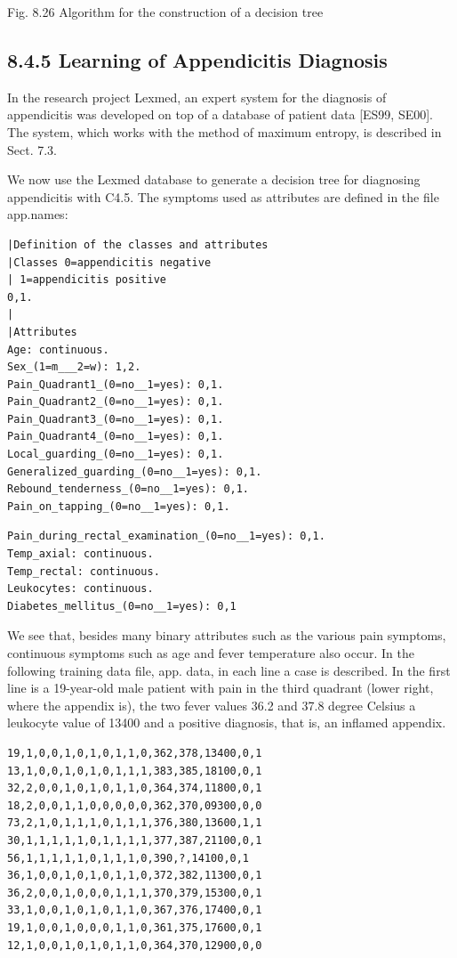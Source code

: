 \documentclass[10pt]{book}
\begin{document}
\begin{center}
\begin{enumerate}
\begin{center}
\begin{center}
Fig. 8.26 Algorithm for the construction of a decision tree

\subsection*{8.4.5 Learning of Appendicitis Diagnosis}
In the research project Lexmed, an expert system for the diagnosis of appendicitis was developed on top of a database of patient data [ES99, SE00]. The system, which works with the method of maximum entropy, is described in Sect. 7.3.

We now use the Lexmed database to generate a decision tree for diagnosing appendicitis with C4.5. The symptoms used as attributes are defined in the file app.names:

\begin{verbatim}
|Definition of the classes and attributes
|Classes 0=appendicitis negative
| 1=appendicitis positive
0,1.
|
|Attributes
Age: continuous.
Sex_(1=m___2=w): 1,2.
Pain_Quadrant1_(0=no__1=yes): 0,1.
Pain_Quadrant2_(0=no__1=yes): 0,1.
Pain_Quadrant3_(0=no__1=yes): 0,1.
Pain_Quadrant4_(0=no__1=yes): 0,1.
Local_guarding_(0=no__1=yes): 0,1.
Generalized_guarding_(0=no__1=yes): 0,1.
Rebound_tenderness_(0=no__1=yes): 0,1.
Pain_on_tapping_(0=no__1=yes): 0,1.
\end{verbatim}

\begin{verbatim}
Pain_during_rectal_examination_(0=no__1=yes): 0,1.
Temp_axial: continuous.
Temp_rectal: continuous.
Leukocytes: continuous.
Diabetes_mellitus_(0=no__1=yes): 0,1
\end{verbatim}

We see that, besides many binary attributes such as the various pain symptoms, continuous symptoms such as age and fever temperature also occur. In the following training data file, app. data, in each line a case is described. In the first line is a 19-year-old male patient with pain in the third quadrant (lower right, where the appendix is), the two fever values 36.2 and 37.8 degree Celsius a leukocyte value of 13400 and a positive diagnosis, that is, an inflamed appendix.

\begin{verbatim}
19,1,0,0,1,0,1,0,1,1,0,362,378,13400,0,1
13,1,0,0,1,0,1,0,1,1,1,383,385,18100,0,1
32,2,0,0,1,0,1,0,1,1,0,364,374,11800,0,1
18,2,0,0,1,1,0,0,0,0,0,362,370,09300,0,0
73,2,1,0,1,1,1,0,1,1,1,376,380,13600,1,1
30,1,1,1,1,1,0,1,1,1,1,377,387,21100,0,1
56,1,1,1,1,1,0,1,1,1,0,390,?,14100,0,1
36,1,0,0,1,0,1,0,1,1,0,372,382,11300,0,1
36,2,0,0,1,0,0,0,1,1,1,370,379,15300,0,1
33,1,0,0,1,0,1,0,1,1,0,367,376,17400,0,1
19,1,0,0,1,0,0,0,1,1,0,361,375,17600,0,1
12,1,0,0,1,0,1,0,1,1,0,364,370,12900,0,0
\end{verbatim}


\end{center}
\end{center}
\end{enumerate}
\end{center}
\end{document}
